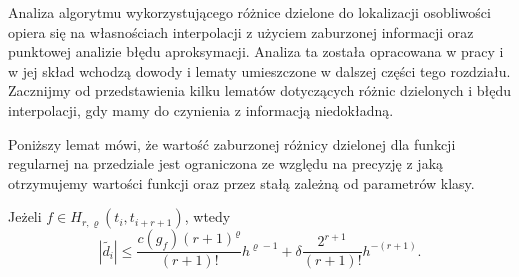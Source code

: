 \documentclass[oik, pdftex, man]{mgrwms}
\begin{document}
    Analiza algorytmu wykorzystującego różnice dzielone do lokalizacji osobliwości opiera się na własnościach interpolacji z użyciem zaburzonej informacji oraz punktowej analizie błędu aproksymacji. Analiza ta została opracowana w pracy \cite{AoP} i w jej skład wchodzą dowody i lematy umieszczone w dalszej części tego rozdziału. Zacznijmy od przedstawienia kilku lematów dotyczących różnic dzielonych i błędu interpolacji, gdy mamy do czynienia z informacją niedokładną.
    
    Poniższy lemat mówi, że wartość zaburzonej różnicy dzielonej dla funkcji regularnej na przedziale jest ograniczona ze względu na precyzję z jaką otrzymujemy wartości funkcji oraz przez stałą zależną od parametrów klasy.

    \begin{lemma} \label{lem:algMP_1}
        Jeżeli $f \in H_{r, \varrho}(t_{i}, t_{i+r+1})$, wtedy
        \begin{equation*}
            |\tilde{d_{i}}| \leq \frac{c(g_{f})(r+1)^{\varrho}}{(r+1)!} h^{\varrho-1} + \delta \frac{2^{r+1}}{(r+1)!} h^{-(r+1)}.
        \end{equation*}
    \end{lemma}
\end{document}
